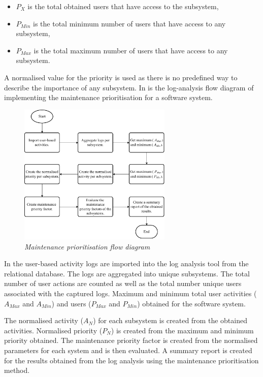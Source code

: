 \begin{itemize}
	\item $P_X$ is the total obtained users that have access to the subsystem,
	\item $P_{Min}$ is the total minimum number of users that have access to any subsystem,
	\item $P_{Max}$ is the total maximum number of users that have access to any subsystem.
\end{itemize}

A normalised value for the priority is used as there is no predefined way to describe the importance of any subsystem. In  is the log-analysis flow diagram of implementing the maintenance prioritisation for a software system. 

\begin{figure}[!htb]
	\centering
	\includegraphics[width=0.65\textwidth]{img/Chapter2/maintenancePriortisation/maintenancePriortisation.pdf}
	\caption[Maintenance prioritisation flow diagram]
	{\textit{Maintenance prioritisation flow diagram}}\label{fig:ch2_maintenancePriortisationFlow}
\end{figure}

In  the user-based activity logs are imported into the log analysis tool from the relational database. The logs are aggregated into unique subsystems. The total number of user actions are counted as well as the total number unique users associated with the captured logs. Maximum and minimum total user activities ($A_{Max}$ and $A_{Min}$) and users ($P_{Max}$ and $P_{Min}$) obtained for the software system. \par The normalised activity ($A_N$) for each subsystem is created from the obtained activities. Normalised priority ($P_N$) is created from the maximum and minimum priority obtained. The maintenance priority factor is created from the normalised parameters for each system and is then evaluated. A summary report is created for the results obtained from the log analysis using the maintenance prioritisation method.

